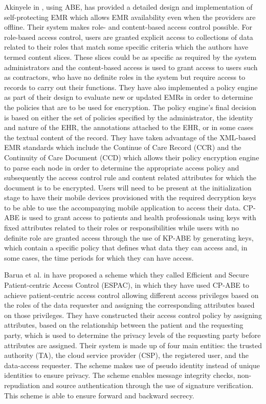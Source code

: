 Akinyele in \cite{Akinyele2010}, using ABE, has provided a detailed design and implementation of self-protecting EMR which allows EMR availability even when the providers are offline. Their system makes role- and content-based access control possible. For role-based access control, users are granted explicit access to collections of data related to their roles that match some specific criteria which the authors have termed content slices. These slices could be as specific as required by the system administrators and the content-based access is used to grant access to users such as contractors, who have no definite roles in the system but require access to records to carry out their functions. They have also implemented a policy engine as part of their design to evaluate new or updated EMRs in order to determine the policies that are to be used for encryption. The policy engine's final decision is based on either the set of policies specified by the administrator, the identity and nature of the EHR, the annotations attached to the EHR, or in some cases the textual content of the record. They have taken advantage of the XML-based EMR standards which include the Continue of Care Record (CCR) and the Continuity of Care Document (CCD) which allows their policy encryption engine to parse each node in order to determine the appropriate access policy and subsequently the access control rule and content related attributes for which the document is to be encrypted. Users will need to be present at the initialization stage to have their mobile devices provisioned with the required decryption keys to be able to use the accompanying mobile application to access their data. CP-ABE is used to grant access to patients and health professionals using keys with fixed attributes related to their roles or responsibilities while users with no definite role are granted access through the use of KP-ABE by generating keys, which contain a specific policy that defines what data they can access and, in some cases, the time periods for which they can have access.

Barua et al. in \cite{Barua2011} have proposed a scheme which they called Efficient and Secure Patient-centric Access Control (ESPAC), in which they have used CP-ABE to achieve patient-centric access control allowing different access privileges based on the roles of the data requester and assigning the corresponding attributes based on those privileges. They have constructed their access control policy by assigning attributes, based on the relationship between the patient and the requesting party, which is used to determine the privacy levels of the requesting party before attributes are assigned. Their system is made up of four main entities: the trusted authority (TA), the cloud service provider (CSP), the registered user, and the data-access requester. The scheme makes use of pseudo identity instead of unique identities to ensure privacy. The scheme enables message integrity checks, non-repudiation and source authentication through the use of signature verification. This scheme is able to ensure forward and backward secrecy.

